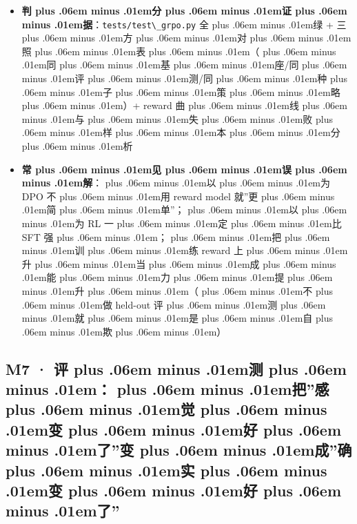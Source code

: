 \documentclass[
]{article}
\newcommand{\passthrough}[1]{#1}
\def\zh#1{{\zhfont #1}}
\def\sym#1{{\symfont #1}}
\def\zhglue{\hskip0pt plus .06em minus .01em}
\begin{document}
\begin{itemize}
\item
  \textbf{\zh{判\zhglue 分\zhglue 证\zhglue 据}}\zh{：}\passthrough{\lstinline!tests/test\_grpo.py!} \zh{全\zhglue 绿} + \zh{三\zhglue 方\zhglue 对\zhglue 照\zhglue 表\zhglue （\zhglue 同\zhglue 基\zhglue 座}/\zh{同\zhglue 评\zhglue 测}/\zh{同\zhglue 种\zhglue 子\zhglue 策\zhglue 略\zhglue ）}+ reward \zh{曲\zhglue 线\zhglue 与\zhglue 失\zhglue 败\zhglue 样\zhglue 本\zhglue 分\zhglue 析}
\item
  \textbf{\zh{常\zhglue 见\zhglue 误\zhglue 解}}\zh{：\zhglue 以\zhglue 为} DPO \zh{不\zhglue 用} reward model \zh{就}''\zh{更\zhglue 简\zhglue 单}''\zh{；\zhglue 以\zhglue 为} RL \zh{一\zhglue 定\zhglue 比} SFT \zh{强\zhglue ；\zhglue 把\zhglue 训\zhglue 练} reward \zh{上\zhglue 升\zhglue 当\zhglue 成\zhglue 能\zhglue 力\zhglue 提\zhglue 升\zhglue （\zhglue 不\zhglue 做} held-out \zh{评\zhglue 测\zhglue 就\zhglue 是\zhglue 自\zhglue 欺\zhglue ）}
\end{itemize}

\subsection{M7 \sym{·} \zh{评\zhglue 测\zhglue ：\zhglue 把}''\zh{感\zhglue 觉\zhglue 变\zhglue 好\zhglue 了}''\zh{变\zhglue 成}''\zh{确\zhglue 实\zhglue 变\zhglue 好\zhglue 了}''}\label{m7-ux8bc4ux6d4bux628aux611fux89c9ux53d8ux597dux4e86ux53d8ux6210ux786eux5b9eux53d8ux597dux4e86}
\end{document}
